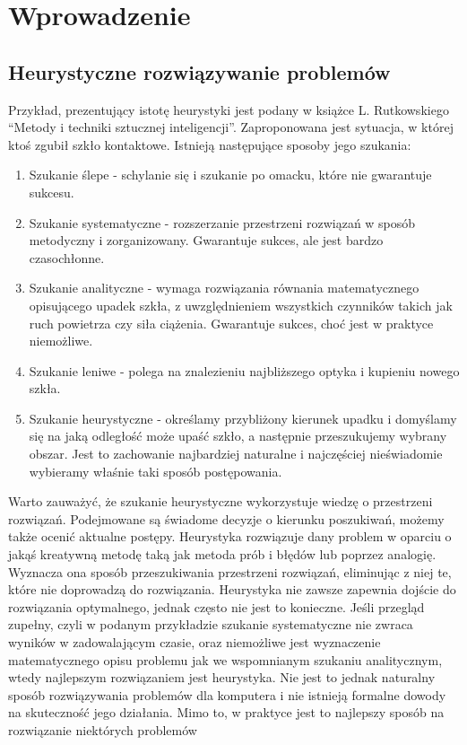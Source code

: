 \documentclass[twoside]{iisthesis}
\begin{document}
\chapter{Wprowadzenie}

\section{Heurystyczne rozwiązywanie problemów}

Przykład, prezentujący istotę heurystyki jest podany w książce L. Rutkowskiego ``Metody i techniki sztucznej inteligencji''. Zaproponowana jest sytuacja, w której ktoś zgubił szkło kontaktowe. Istnieją następujące sposoby jego szukania:

\begin{enumerate}
\item Szukanie ślepe - schylanie się i szukanie po omacku, które nie gwarantuje sukcesu.
\item Szukanie systematyczne - rozszerzanie przestrzeni rozwiązań w sposób metodyczny i zorganizowany. Gwarantuje sukces, ale jest bardzo czasochłonne.
\item Szukanie analityczne - wymaga rozwiązania równania matematycznego opisującego upadek szkła, z uwzględnieniem wszystkich czynników takich jak ruch powietrza czy siła ciążenia. Gwarantuje sukces, choć jest w praktyce niemożliwe.
\item Szukanie leniwe - polega na znalezieniu najbliższego optyka i kupieniu nowego szkła.
\item Szukanie heurystyczne - określamy przybliżony kierunek upadku i domyślamy się na jaką odległość może upaść szkło, a następnie przeszukujemy wybrany obszar. Jest to zachowanie najbardziej naturalne i najczęściej nieświadomie wybieramy właśnie taki sposób postępowania.
\end{enumerate}

Warto zauważyć, że szukanie heurystyczne wykorzystuje wiedzę o przestrzeni rozwiązań. Podejmowane są świadome decyzje o kierunku poszukiwań, możemy także ocenić aktualne postępy. Heurystyka rozwiązuje dany problem w oparciu o jakąś kreatywną metodę taką jak metoda prób i błędów lub poprzez analogię. Wyznacza ona sposób przeszukiwania przestrzeni rozwiązań, eliminując z niej te, które nie doprowadzą do rozwiązania. Heurystyka nie zawsze zapewnia dojście do rozwiązania optymalnego, jednak często nie jest to konieczne. Jeśli przegląd zupełny, czyli w podanym przykładzie szukanie systematyczne nie zwraca wyników w zadowalającym czasie, oraz niemożliwe jest wyznaczenie matematycznego opisu problemu jak we wspomnianym szukaniu analitycznym, wtedy najlepszym rozwiązaniem jest heurystyka. Nie jest to jednak naturalny sposób rozwiązywania problemów dla komputera i nie istnieją formalne dowody na skuteczność jego działania. Mimo to, w praktyce jest to najlepszy sposób na rozwiązanie niektórych problemów
\end{document}
